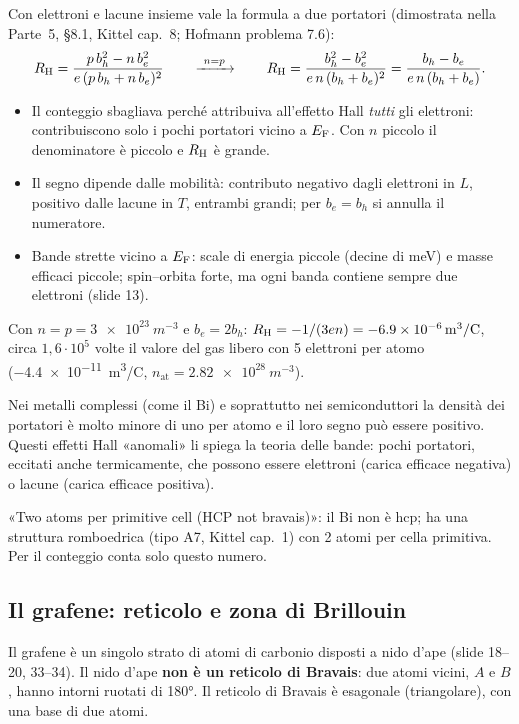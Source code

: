 \documentclass[11pt,a4paper]{article}
\begin{document}
Con elettroni e lacune insieme vale la formula a due portatori (dimostrata nella Parte~5, §8.1, Kittel cap.~8; Hofmann problema 7.6):
\[
\RH=\frac{p\,b_h^2-n\,b_e^2}{e\,(p\,b_h+n\,b_e)^2}\qquad\xrightarrow{\ n=p\ }\qquad
\RH=\frac{b_h^2-b_e^2}{e\,n\,(b_h+b_e)^2}=\frac{b_h-b_e}{e\,n\,(b_h+b_e)} .
\]
\begin{itemize}
\item Il conteggio sbagliava perché attribuiva all'effetto Hall \emph{tutti} gli elettroni: contribuiscono solo i pochi portatori vicino a $E_{\mathrm F}$.
Con $n$ piccolo il denominatore è piccolo e $R_{\mathrm H}$ è grande.
\item Il segno dipende dalle mobilità: contributo negativo dagli elettroni in $L$, positivo dalle lacune in $T$, entrambi grandi; per $b_e=b_h$ si
annulla il numeratore.
\item Bande strette vicino a $E_{\mathrm F}$: scale di energia piccole (decine di meV) e masse efficaci piccole; spin--orbita forte, ma ogni banda contiene
sempre due elettroni (slide 13).
\end{itemize}

\begin{esempio}
Con $n=p=\SI{3e23}{m^{-3}}$ e $b_e=2b_h$: $R_{\mathrm H}=-1/(3en)=\SI{-6.9e-6}{m^3/C}$, circa $1{,}6\cdot10^5$ volte il valore del gas libero con 5 elettroni
per atomo (\SI{-4.4e-11}{m^3/C}, $n_{\mathrm{at}}=\SI{2.82e28}{m^{-3}}$).
\end{esempio}

\begin{riepilogo}
Nei metalli complessi (come il Bi) e soprattutto nei semiconduttori la densità dei portatori è molto minore di uno per atomo e il loro segno può
essere positivo. Questi effetti Hall «anomali» li spiega la teoria delle bande: pochi portatori, eccitati anche termicamente, che possono essere
elettroni (carica efficace negativa) o lacune (carica efficace positiva).
\end{riepilogo}

\begin{osservazione}[slide 13]
«Two atoms per primitive cell (HCP not bravais)»: il Bi non è hcp; ha una struttura romboedrica (tipo A7, Kittel cap.~1) con 2 atomi per cella
primitiva. Per il conteggio conta solo questo numero.
\end{osservazione}

\subsection{Il grafene: reticolo e zona di Brillouin}\label{sec:grafenereticolo}
Il grafene è un singolo strato di atomi di carbonio disposti a nido d'ape (slide 18--20, 33--34). Il nido d'ape \textbf{non è un reticolo di
Bravais}: due atomi vicini, $A$ e $B$, hanno intorni ruotati di \ang{180}. Il reticolo di Bravais è esagonale (triangolare), con una base di due atomi.
\end{document}
